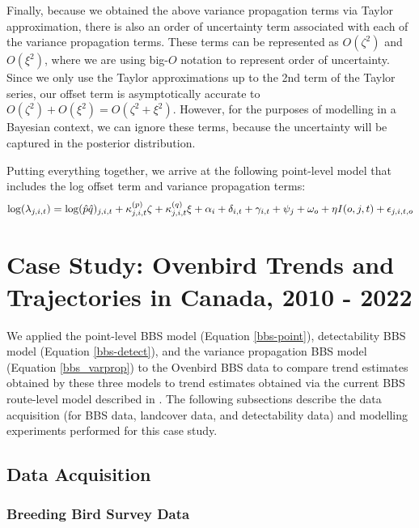 \par Finally, because we obtained the above variance propagation terms via Taylor approximation, there is also an order of uncertainty term associated with each of the variance propagation terms.
These terms can be represented as $O(\zeta^2)$ and $O(\xi^2)$, where we are using big-$O$ notation to represent order of uncertainty. 
Since we only use the Taylor approximations up to the 2nd term of the Taylor series, our offset term is asymptotically accurate to $O(\zeta^2) + O(\xi^2) = O(\zeta^2 + \xi^2)$.
However, for the purposes of modelling in a Bayesian context, we can ignore these terms, because the uncertainty will be captured in the posterior distribution.

Putting everything together, we arrive at the following point-level model that includes the log offset term and variance propagation terms:
\begin{equation}\label{bbs_varprop}
	\log(\lambda_{j,i,t}) = \log(\hat{p} \hat{q})_{j,i,t} + \kappa_{j,i,t}^{(p)}\zeta + \kappa_{j,i,t}^{(q)}\xi + \alpha_i + \delta_{i,t} + \gamma_{i,t} + \psi_j + \omega_o + \eta I(o,j,t) + \epsilon_{j,i,t,o} \\
\end{equation}

\section{Case Study: Ovenbird Trends and Trajectories in Canada, 2010 - 2022}

\par We applied the point-level BBS model (Equation \ref{bbs-point}), detectability BBS model (Equation \ref{bbs-detect}), and the variance propagation BBS model (Equation \ref{bbs_varprop}) to the Ovenbird BBS data to compare trend estimates obtained by these three models to trend estimates obtained via the current BBS route-level model described in \citet{smith_spatially_2023}.
The following subsections describe the data acquisition (for BBS data, landcover data, and detectability data) and modelling experiments performed for this case study.

\subsection{Data Acquisition}

\subsubsection{Breeding Bird Survey Data}

